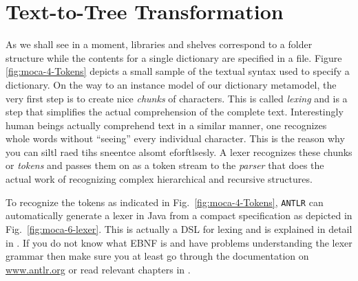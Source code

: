 \section{Text-to-Tree Transformation}

As we shall see in a moment, libraries and shelves correspond to a folder structure while the contents for a single dictionary are specified in a file.
Figure \ref{fig:moca-4-Tokens} depicts a small sample of the textual syntax used to specify a dictionary.
On the way to an instance model of our dictionary metamodel, the very first step is to create nice \emph{chunks} of characters.
This is called \emph{lexing} and is a step that simplifies the actual comprehension of the complete text.
Interestingly human beings actually comprehend text in a similar manner, one recognizes whole words without ``seeing'' every individual character.
This is the reason why you can siltl raed tihs sneentce alsomt eforftlsesly.   
A lexer recognizes these chunks or \emph{tokens} and passes them on as a token stream to the \emph{parser} that does the actual work of recognizing complex hierarchical and recursive structures.   
   
To recognize the tokens as indicated in Fig.~\ref{fig:moca-4-Tokens}, \texttt{ANTLR} can automatically generate a lexer in Java from a compact specification as depicted in Fig.~\ref{fig:moca-6-lexer}.
This is actually a DSL for lexing and is explained in detail in \cite{ANTLR}.
If you do not know what EBNF is and have problems understanding the lexer grammar then make sure you at least go through the documentation on \url{www.antlr.org} or read relevant chapters in \cite{ANTLR}.


